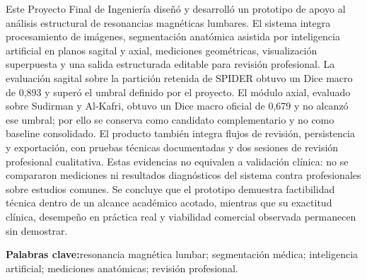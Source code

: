 \begin{Resumen}
Este Proyecto Final de Ingeniería diseñó y desarrolló un prototipo de apoyo al análisis estructural de resonancias magnéticas lumbares. El sistema integra procesamiento de imágenes, segmentación anatómica asistida por inteligencia artificial en planos sagital y axial, mediciones geométricas, visualización superpuesta y una salida estructurada editable para revisión profesional. La evaluación sagital sobre la partición retenida de SPIDER obtuvo un Dice macro de 0,893 y superó el umbral definido por el proyecto. El módulo axial, evaluado sobre Sudirman y Al-Kafri, obtuvo un Dice macro oficial de 0,679 y no alcanzó ese umbral; por ello se conserva como candidato complementario y no como baseline consolidado. El producto también integra flujos de revisión, persistencia y exportación, con pruebas técnicas documentadas y dos sesiones de revisión profesional cualitativa. Estas evidencias no equivalen a validación clínica: no se compararon mediciones ni resultados diagnósticos del sistema contra profesionales sobre estudios comunes. Se concluye que el prototipo demuestra factibilidad técnica dentro de un alcance académico acotado, mientras que su exactitud clínica, desempeño en práctica real y viabilidad comercial observada permanecen sin demostrar.

\vspace{0.5em}
\noindent\textbf{Palabras clave:}\enspace resonancia magnética lumbar; segmentación médica; inteligencia artificial; mediciones anatómicas; revisión profesional.
\end{Resumen}
